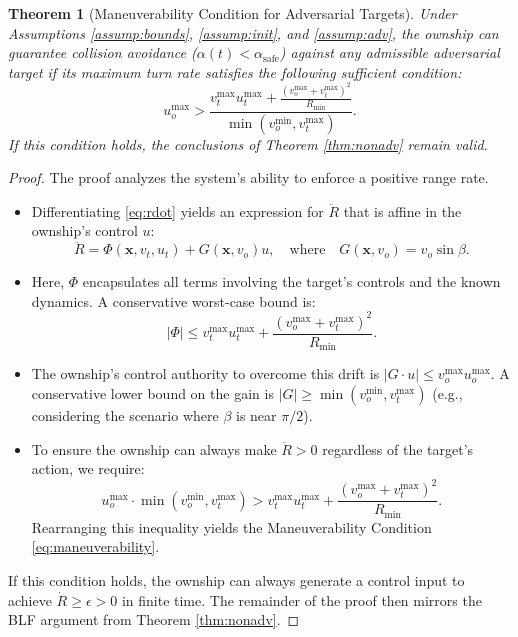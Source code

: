 \documentclass[10pt]{article}
\theoremstyle{plain}
\newtheorem{theorem}{Theorem}
\begin{document}
\begin{theorem}[Maneuverability Condition for Adversarial Targets]\label{thm:adv}
    Under Assumptions \ref{assump:bounds}, \ref{assump:init}, and \ref{assump:adv}, the ownship can guarantee collision avoidance ($\alpha(t) < \alpha_{\text{safe}}$) against any admissible adversarial target if its maximum turn rate satisfies the following sufficient condition:
    \begin{equation}\label{eq:maneuverability}
        u_o^{\max} > \frac{v_t^{\max} u_t^{\max} + \frac{(v_o^{\max} + v_t^{\max})^2}{R_{\text{min}}}}{\min(v_o^{\min}, v_t^{\max})}.
    \end{equation}
    If this condition holds, the conclusions of Theorem \ref{thm:nonadv} remain valid.
\end{theorem}

\begin{proof}
    The proof analyzes the system's ability to enforce a positive range rate.
    \begin{itemize}
        \item Differentiating \eqref{eq:rdot} yields an expression for $\ddot{R}$ that is affine in the ownship's control $u$:
        \[
        \ddot{R} = \Phi(\mathbf{x}, v_t, u_t) + G(\mathbf{x}, v_o) u, \quad \text{where} \quad G(\mathbf{x}, v_o) = v_o \sin\beta.
        \]
    \item Here, $\Phi$ encapsulates all terms involving the target's controls and the known dynamics. A conservative worst-case bound is:
    \[
    |\Phi| \leq v_t^{\max} u_t^{\max} + \frac{(v_o^{\max} + v_t^{\max})^2}{R_{\text{min}}}.
    \]
        \item The ownship's control authority to overcome this drift is $|G \cdot u| \leq v_o^{\max} u_o^{\max}$. A conservative lower bound on the gain is $|G| \geq \min(v_o^{\min}, v_t^{\max})$ (e.g., considering the scenario where $\beta$ is near $\pi/2$).
    \item To ensure the ownship can always make $\ddot{R} > 0$ regardless of the target's action, we require:
    \[
    u_o^{\max} \cdot \min(v_o^{\min}, v_t^{\max}) > v_t^{\max} u_t^{\max} + \frac{(v_o^{\max} + v_t^{\max})^2}{R_{\text{min}}}.
    \]
        Rearranging this inequality yields the Maneuverability Condition \eqref{eq:maneuverability}.
    \end{itemize}
    If this condition holds, the ownship can always generate a control input to achieve $\dot{R} \geq \epsilon > 0$ in finite time. The remainder of the proof then mirrors the BLF argument from Theorem \ref{thm:nonadv}.
\end{proof}
\end{document}
